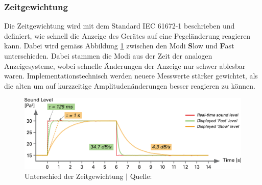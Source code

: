 \documentclass[12pt]{article}
\begin{document}
	\subsubsection*{Zeitgewichtung} \label{Zeitgewichtung}
	Die Zeitgewichtung wird mit dem Standard IEC 61672-1 beschrieben und definiert, wie schnell die Anzeige des Gerätes auf eine Pegeländerung reagieren kann. Dabei wird gemäss Abbildung \ref{fig:batf-s-time-weighting} zwischen den Modi \textbf{S}low und \textbf{F}ast unterschieden. Dabei stammen die Modi aus der Zeit der analogen Anzeigesysteme, wobei schnelle Änderungen der Anzeige nur schwer ablesbar waren. Implementationstechnisch werden neuere Messwerte stärker gewichtet, als die alten um auf kurzzeitige Amplitudenänderungen besser reagieren zu können.
	\begin{figure}[H]
		\centering
		\includegraphics[width=1\linewidth]{images/BAT_F-S-time-weighting}
		\caption{Unterschied der Zeitgewichtung $\vert$ Quelle: \cite{noauthor_was_nodate}}
		\label{fig:batf-s-time-weighting}
	\end{figure}
	
\end{document}
